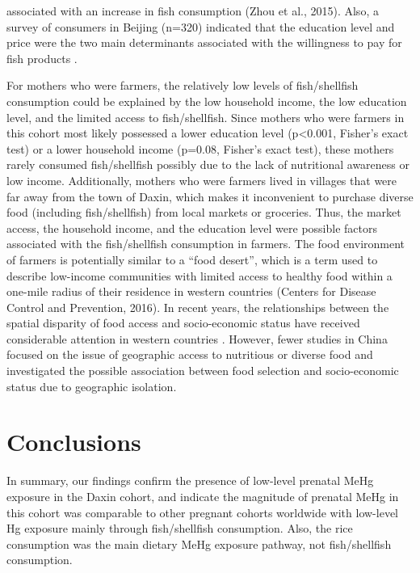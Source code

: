associated with an increase in fish consumption (Zhou et al., 2015). Also, a survey of consumers in Beijing (n=320) indicated that the education level and price were the two main determinants associated with the willingness to pay for fish products \citep{wang2009consumers}.

For mothers who were farmers, the relatively low levels of fish/shellfish consumption could be explained by the low household income, the low education level, and the limited access to fish/shellfish. Since mothers who were farmers in this cohort most likely possessed a lower education level (p<0.001, Fisher's exact test) or a lower household income (p=0.08, Fisher's exact test), these mothers rarely consumed fish/shellfish possibly due to the lack of nutritional awareness or low income. Additionally, mothers who were farmers lived in villages that were far away from the town of Daxin, which makes it inconvenient to purchase diverse food (including fish/shellfish) from local markets or groceries. Thus, the market access, the household income, and the education level were possible factors associated with the fish/shellfish consumption in farmers. The food environment of farmers is potentially similar to a ``food desert'', which is a term used to describe low-income communities with limited access to healthy food within a one-mile radius of their residence in western countries (Centers for Disease Control and Prevention, 2016). In recent years, the relationships between the spatial disparity of food access and socio-economic status have received considerable attention in western countries \citep{moore2006associations, glanz2007nutrition,powell2007food}. However, fewer studies in China focused on the issue of geographic access to nutritious or diverse food and investigated the possible association between food selection and socio-economic status due to geographic isolation.

\section{Conclusions}

In summary, our findings confirm the presence of low-level prenatal MeHg exposure in the Daxin cohort, and indicate the magnitude of prenatal MeHg in this cohort was comparable to other pregnant cohorts worldwide with low-level Hg exposure mainly through fish/shellfish consumption. Also, the rice consumption was the main dietary MeHg exposure pathway, not fish/shellfish consumption.


